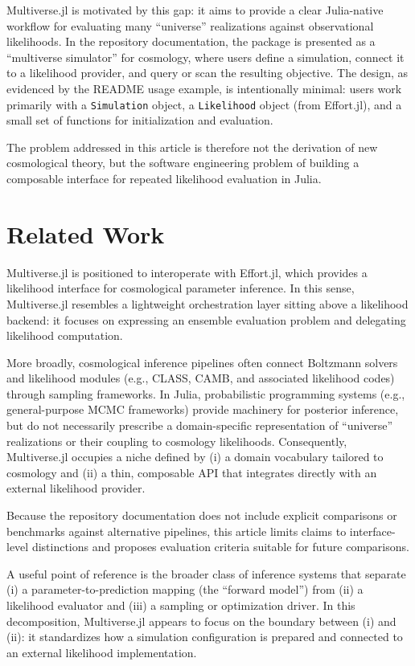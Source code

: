 \documentclass[11pt]{article}
\begin{document}
Multiverse.jl is motivated by this gap: it aims to provide a clear Julia-native workflow for evaluating many ``universe'' realizations against observational likelihoods.
In the repository documentation, the package is presented as a ``multiverse simulator'' for cosmology, where users define a simulation, connect it to a likelihood provider, and query or scan the resulting objective.
The design, as evidenced by the README usage example, is intentionally minimal: users work primarily with a \texttt{Simulation} object, a \texttt{Likelihood} object (from Effort.jl), and a small set of functions for initialization and evaluation.

The problem addressed in this article is therefore not the derivation of new cosmological theory, but the software engineering problem of building a composable interface for repeated likelihood evaluation in Julia.

\section{Related Work}
Multiverse.jl is positioned to interoperate with Effort.jl, which provides a likelihood interface for cosmological parameter inference.
In this sense, Multiverse.jl resembles a lightweight orchestration layer sitting above a likelihood backend: it focuses on expressing an ensemble evaluation problem and delegating likelihood computation.

More broadly, cosmological inference pipelines often connect Boltzmann solvers and likelihood modules (e.g., CLASS, CAMB, and associated likelihood codes) through sampling frameworks.
In Julia, probabilistic programming systems (e.g., general-purpose MCMC frameworks) provide machinery for posterior inference, but do not necessarily prescribe a domain-specific representation of ``universe'' realizations or their coupling to cosmology likelihoods.
Consequently, Multiverse.jl occupies a niche defined by (i) a domain vocabulary tailored to cosmology and (ii) a thin, composable API that integrates directly with an external likelihood provider.

Because the repository documentation does not include explicit comparisons or benchmarks against alternative pipelines, this article limits claims to interface-level distinctions and proposes evaluation criteria suitable for future comparisons.

A useful point of reference is the broader class of inference systems that separate (i) a parameter-to-prediction mapping (the ``forward model'') from (ii) a likelihood evaluator and (iii) a sampling or optimization driver.
In this decomposition, Multiverse.jl appears to focus on the boundary between (i) and (ii): it standardizes how a simulation configuration is prepared and connected to an external likelihood implementation.
\end{document}
